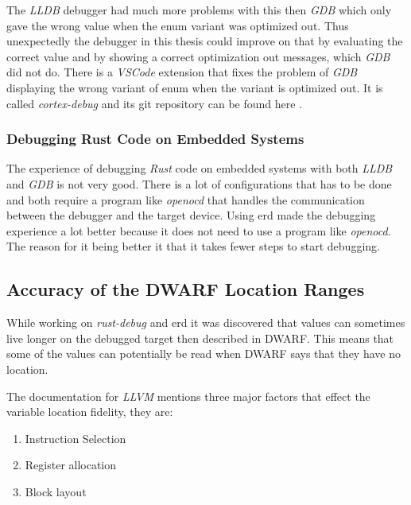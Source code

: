 The \emph{LLDB} debugger had much more problems with this then \emph{GDB} which only gave the wrong value when the enum variant was optimized out.
Thus unexpectedly the debugger in this thesis could improve on that by evaluating the correct value and by showing a correct optimization out messages, which \emph{GDB} did not do.
There is a \emph{VSCode} extension that fixes the problem of \emph{GDB} displaying the wrong variant of enum when the variant is optimized out.
It is called \emph{cortex-debug} and its git repository can be found here \cite{cortex-debug}.


\subsubsection{Debugging Rust Code on Embedded Systems}
The experience of debugging \emph{Rust} code on embedded systems with both \emph{LLDB} and \emph{GDB} is not very good.
There is a lot of configurations that has to be done and both require a program like \emph{openocd} that handles the communication between the debugger and the target device.
Using \gls{erd} made the debugging experience a lot better because it does not need to use a program like \emph{openocd}.
The reason for it being better it that it takes fewer steps to start debugging.


\subsection{Accuracy of the \gls{DWARF} Location Ranges}\label{subsection:loc-ranges}
While working on \emph{rust-debug} and \gls{erd} it was discovered that values can sometimes live longer on the debugged target then described in \gls{DWARF}.
This means that some of the values can potentially be read when \gls{DWARF} says that they have no location.


The documentation for \emph{LLVM} \cite{llvm-dbs} mentions three major factors that effect the variable location fidelity, they are:

\begin{enumerate}
  \item Instruction Selection
  \item Register allocation
  \item Block layout
\end{enumerate}

